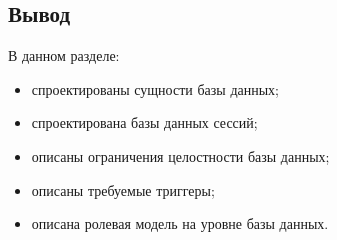 \subsection*{Вывод}
В данном разделе:

\begin{itemize}[leftmargin=1.6\parindent]
	\item спроектированы сущности базы данных;
	\item спроектирована базы данных сессий;
	\item описаны  ограничения целостности базы данных;
	\item описаны требуемые триггеры;
	\item описана ролевая модель на уровне базы данных.
\end{itemize}


\pagebreak